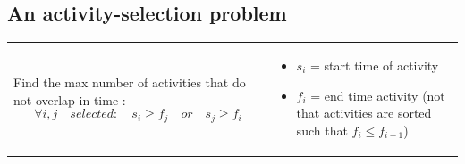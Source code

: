 
\subsection{An activity-selection problem}
\begin{tabular}{m{6cm}m{10cm}}
    Find the max number of activities that do not
    overlap in time : 
    $$\forall i,j \quad selected: \quad s_i \geq f_j  \quad or \quad s_j \geq f_i$$
    &
\begin{itemize}
    \item $s_i$ = start time of activity
    \item $f_i$ = end time activity (not that activities are 
        sorted such that $f_i \leq f_{i+1}$)
\end{itemize}
\end{tabular}

